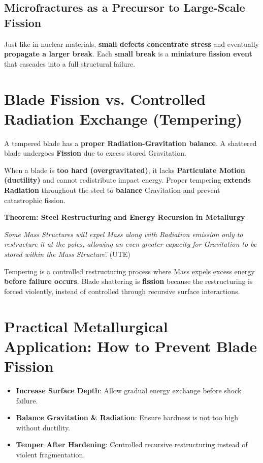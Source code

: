 \documentclass{article}
\begin{document}
\subsection{Microfractures as a Precursor to Large-Scale Fission}
Just like in nuclear materials, \textbf{small defects concentrate stress} and eventually \textbf{propagate a larger break}. Each \textbf{small break} is a \textbf{miniature fission event} that cascades into a full structural failure.

\section{Blade Fission vs. Controlled Radiation Exchange (Tempering)}
A tempered blade has a \textbf{proper Radiation-Gravitation balance}. A shattered blade undergoes \textbf{Fission} due to excess stored Gravitation.

When a blade is \textbf{too hard (overgravitated)}, it lacks \textbf{Particulate Motion (ductility)} and cannot redistribute impact energy. Proper tempering \textbf{extends Radiation} throughout the steel to \textbf{balance} Gravitation and prevent catastrophic fission.

\textbf{Theorem: Steel Restructuring and Energy Recursion in Metallurgy}

\textit{\"Some Mass Structures will expel Mass along with Radiation emission only to restructure it at the poles, allowing an even greater capacity for Gravitation to be stored within the Mass Structure.\"} (UTE)

Tempering is a controlled restructuring process where Mass expels excess energy \textbf{before failure occurs}. Blade shattering is \textbf{fission} because the restructuring is forced violently, instead of controlled through recursive surface interactions.

\section{Practical Metallurgical Application: How to Prevent Blade Fission}
\begin{itemize}
    \item \textbf{Increase Surface Depth}: Allow gradual energy exchange before shock failure.
    \item \textbf{Balance Gravitation \& Radiation}: Ensure hardness is not too high without ductility.
    \item \textbf{Temper After Hardening}: Controlled recursive restructuring instead of violent fragmentation.
\end{itemize}
\end{document}
